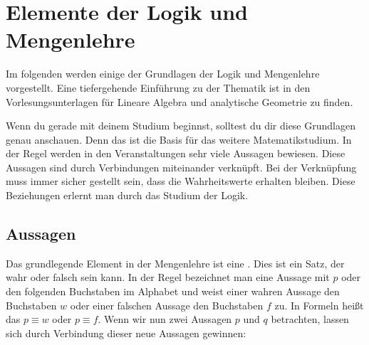 \documentclass[ngerman,titlepage,twoside, parskip=half*]{scrreprt}
\theoremstyle{plain}
\theoremstyle{definition}
\theoremstyle{remark}
\newcommand*{\highl}[2][]{\textbf{\boldmath{#2}}%
  \ifthenelse{\equal{#1}{}}{\index{#2}}{\index{#1}}%
}
\begin{document}
\chapter{Elemente der Logik und Mengenlehre}

Im folgenden werden einige der Grundlagen der Logik und Mengenlehre
vorgestellt. Eine tiefergehende Einführung zu der Thematik ist in den
Vorlesungsunterlagen für Lineare Algebra und analytische Geometrie zu finden.

Wenn du gerade mit deinem Studium beginnst, solltest du dir diese Grundlagen
genau anschauen. Denn das ist die Basis für das weitere Matematikstudium. In
der Regel werden in den Veranstaltungen sehr viele Aussagen bewiesen. Diese
Aussagen sind durch Verbindungen miteinander verknüpft. Bei der Verknüpfung
muss immer sicher gestellt sein, dass die Wahrheitswerte erhalten bleiben.
Diese Beziehungen erlernt man durch das Studium der Logik.

\section{Aussagen}

Das grundlegende Element in der Mengenlehre ist eine \highl{Aussage}. Dies ist
ein Satz, der wahr oder falsch sein kann. In der Regel bezeichnet man eine
Aussage mit $p$ oder den folgenden Buchstaben im Alphabet und weist einer
wahren Aussage den Buchstaben $w$ oder einer falschen Aussage den Buchstaben
$f$ zu. In Formeln heißt das $p\equiv w$ oder $p\equiv f$. Wenn wir nun zwei
Aussagen $p$ und $q$ betrachten, lassen sich durch Verbindung dieser neue
Aussagen gewinnen:
\end{document}

